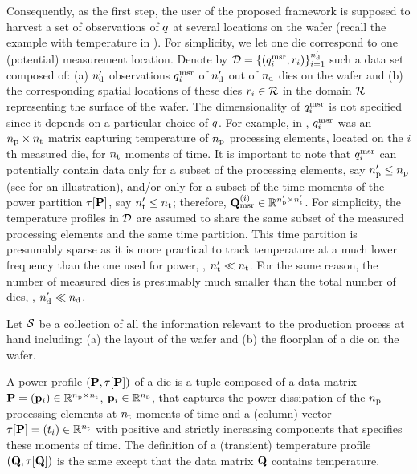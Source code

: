 Consequently, as the first step, the user of the proposed framework is supposed to harvest a set of observations of $q$ at several locations on the wafer (recall the example with temperature in ).
For simplicity, we let one die correspond to one (potential) measurement location.
Denote by $\mathcal{D} = \{ (q_i^{\text{msr}}, r_i) \}_{i = 1}^{n_\text{d}'}$ such a data set composed of: (a) ${n_\text{d}'}$ observations $q_i^{\text{msr}}$ of ${n_\text{d}'}$ out of ${n_\text{d}}$ dies on the wafer and (b) the corresponding spatial locations of these dies $r_i \in \mathcal{R}$ in the domain $\mathcal{R}$ representing the surface of the wafer.
The dimensionality of $q_i^{\text{msr}}$ is not specified since it depends on a particular choice of $q$.
For example, in , $q_i^{\text{msr}}$ was an ${n_\text{p}} \times {n_\text{t}}$ matrix capturing temperature of ${n_\text{p}}$ processing elements, located on the $i$th measured die, for ${n_\text{t}}$ moments of time.
It is important to note that $q_i^{\text{msr}}$ can potentially contain data only for a subset of the processing elements, say ${n_\text{p}'} \leq {n_\text{p}}$ (see  for an illustration), and/or only for a subset of the time moments of the power partition $\tau[\mathbf{P}]$, say ${n_\text{t}'} \leq {n_\text{t}}$; therefore, $\mathbf{Q}^{(i)}_{\text{msr}} \in \mathbb{R}^{{n_\text{p}'} \times {n_\text{t}'}}$.
For simplicity, the temperature profiles in $\mathcal{D}$ are assumed to share the same subset of the measured processing elements and the same time partition.
This time partition is presumably sparse as it is more practical to track temperature at a much lower frequency than the one used for power, \ie, ${n_\text{t}'} \ll {n_\text{t}}$.
For the same reason, the number of measured dies is presumably much smaller than the total number of dies, \ie, ${n_\text{d}'} \ll {n_\text{d}}$.


Let $\mathcal{S}$ be a collection of all the information relevant to the production process at hand including: (a) the layout of the wafer and (b) the floorplan of a die on the wafer.

A power profile $\profileP$ of a die is a tuple composed of a data matrix $\mathbf{P} = (\mathbf{p}_i) \in \mathbb{R}^{{n_\text{p}} \times {n_\text{t}}}$, $\mathbf{p}_i \in \mathbb{R}^{n_\text{p}}$, that captures the power dissipation of the ${n_\text{p}}$ processing elements at ${n_\text{t}}$ moments of time and a (column) vector $\tau[\mathbf{P}] = (t_i) \in \mathbb{R}^{{n_\text{t}}}$ with positive and strictly increasing components that specifies these moments of time.
The definition of a (transient) temperature profile $\profileT$ is the same except that the data matrix $\mathbf{Q}$ contains temperature.
